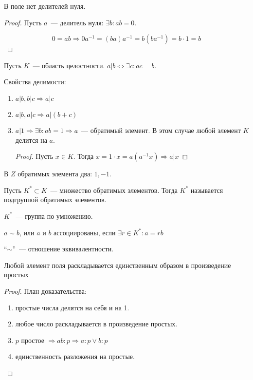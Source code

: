 \begin{claim}
  В поле нет делителей нуля.
\end{claim}

\begin{proof}
  Пусть $a$~--- делитель нуля: $\exists b : ab = 0$.

  $$
    0 = ab \Rightarrow 0a^{-1} = (ba)a^{-1} = b(ba^{-1}) = b\cdot 1 = b
  $$
\end{proof}

Пусть $K$~--- область целостности.
$a|b \Leftrightarrow \exists c : ac = b$.

Свойства делимости:

\begin{enumerate}
  \item $a | b, b | c \Rightarrow a | c$
    \item $a | b, a | c \Rightarrow a | (b+c)$
    \item $a | 1 \Rightarrow \exists b : ab = 1 \Rightarrow a$~--- обратимый элемент.
      В этом случае любой элемент $K$ делится на $a$.

      \begin{proof}
        Пусть $x\in K$. Тогда $x = 1\cdot x = a(a^{-1}x) \Rightarrow a|x$
      \end{proof}
\end{enumerate}

\begin{example}
  В $Z$ обратимых элемента два: $1, -1$.
\end{example}

\begin{define*}
  Пусть $K^* \subset K$~--- множество обратимых элементов. Тогда $K^*$ называется подгруппой обратимых элементов.
\end{define*}

\begin{exercise}
  $K^*$~--- группа по умножению.
\end{exercise}

\begin{define*}
  $a \sim b$, или $a$ и $b$ ассоциированы, если $\exists r \in K^* : a = rb$
\end{define*}

\begin{exercise}
  ``$\sim$''~--- отношение эквивалентности.
\end{exercise}

\begin{Th}
  Любой элемент поля раскладывается единственным образом в произведение простых
\end{Th}
\begin{proof}
  План доказательства:
  \begin{enumerate}
    \item простые числа делятся на себя и на 1.
    \item любое число раскладывается в произведение простых.
    \item $p$ простое $\Rightarrow ab : p \Longrightarrow a:p \lor b:p$
    \item единственность разложения на простые.
  \end{enumerate}
\end{proof}

